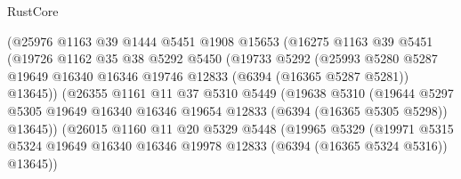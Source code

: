 \begin{lexlean}{RustCore}
\begin{coremodule}
                        (@25976
                          @1163
                          @39
                          @1444
                          @5451
                          @1908
                          @15653
                          (@16275
                            @1163
                            @39
                            @5451
                            (@19726
                              @1162
                              @35
                              @38
                              @5292
                              @5450
                              (@19733
                                @5292
                                (@25993
                                  @5280
                                  @5287
                                  @19649
                                  @16340
                                  @16346
                                  @19746
                                  @12833
                                  (@6394 (@16365 @5287 @5281))
                                  @13645))
                              (@26355
                                @1161
                                @11
                                @37
                                @5310
                                @5449
                                (@19638
                                  @5310
                                  (@19644
                                    @5297
                                    @5305
                                    @19649
                                    @16340
                                    @16346
                                    @19654
                                    @12833
                                    (@6394 (@16365 @5305 @5298))
                                    @13645))
                                (@26015
                                  @1160
                                  @11
                                  @20
                                  @5329
                                  @5448
                                  (@19965
                                    @5329
                                    (@19971
                                      @5315
                                      @5324
                                      @19649
                                      @16340
                                      @16346
                                      @19978
                                      @12833
                                      (@6394 (@16365 @5324 @5316))
                                      @13645))

\end{coremodule}
\end{lexlean}

